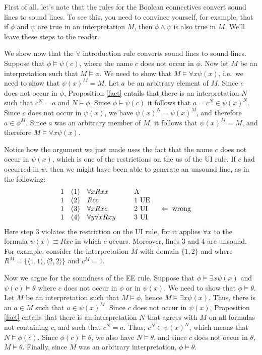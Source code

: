First of all, let's note that the rules for the Boolean connectives
convert sound lines to sound lines.  To see this, you need to convince
yourself, for example, that if $\phi$ and $\psi$ are true in an
interpretation $M$, then $\phi\wedge\psi$ is also true in $M$.  We'll
leave these steps to the reader.

We show now that the $\forall$ introduction rule converts sound lines
to sound lines.  Suppose that $\phi \vDash \psi (c)$, where the name
$c$ does not occur in $\phi$.  Now let $M$ be an interpretation such
that $M\vDash \phi$.  We need to show that
$M\vDash \forall x\psi (x)$, i.e.\ we need to show that
$\psi (x)^M=M$.  Let $a$ be an arbitrary element of $M$.  Since $c$
does not occur in $\phi$, Proposition \ref{fact} entails that there is
an interpretation $N$ such that $c^N=a$ and $N\vDash \phi$.  Since
$\phi\vDash\psi (c)$ it follows that $a=c^N\in \psi (x)^N$.  Since $c$
does not occur in $\psi (x)$, we have $\psi (x)^N=\psi (x)^M$, and
therefore $a\in \phi ^M$.  Since $a$ was an arbitrary member of $M$,
it follows that $\psi (x)^M=M$, and therefore
$M\vDash \forall x\psi (x)$.

Notice how the argument we just made uses the fact that the name $c$
does not occur in $\psi (x)$, which is one of the restrictions on the
us of the UI rule.  If $c$ had occurred in $\psi$, then we might have
been able to generate an unsound line, as in the following:
\[ \begin{array}{l l >{$}p{2cm}<{$} p{1cm} p{2cm}}
     1 & (1) & \forall xRxx & A \\
     1 & (2) & Rcc & 1 UE \\
     1 & (3) & \forall xRxc & 2 UI & $\Leftarrow\:$ wrong \\
     1 & (4) & \forall y\forall xRxy & 3 UI \end{array} \] Here step 3
 violates the restriction on the UI rule, for it applies $\forall x$
 to the formula $\psi (x)\equiv Rxc$ in which $c$ occurs.  Moreover,
 lines 3 and 4 are unsound.  For example, consider the interpretation $M$ with domain $\{ 1,2\}$ and where $R^M=\{ \langle 1,1\rangle ,\langle 2,2\rangle \}$ and $c^M=1$.

Now we argue for the soundness of the EE rule.  Suppose that
$\phi\vDash \exists x\psi (x)$ and $\psi (c)\vDash \theta$ where $c$
does not occur in $\phi$ or in $\psi (x)$.  We need to show that
$\phi\vDash\theta$.  Let $M$ be an interpretation such that
$M\vDash\phi$, hence $M\vDash\exists x\psi (x)$.  Thus, there is an
$a\in M$ such that $a\in \psi (x)^M$.  Since $c$ does not occur in
$\psi (x)$, Proposition \ref{fact} entails that there is an
interpretation $N$ that agrees with $M$ on all formulas not containing
$c$, and such that $c^N=a$.  Thus, $c^N\in \psi (x)^N$, which means
that $N\vDash \phi (c)$.  Since $\phi (c)\vDash\theta$, we also have
$N\vDash\theta$, and since $c$ does not occur in $\theta$,
$M\vDash\theta$.  Finally, since $M$ was an arbitrary interpretation,
$\phi\vDash\theta$.

